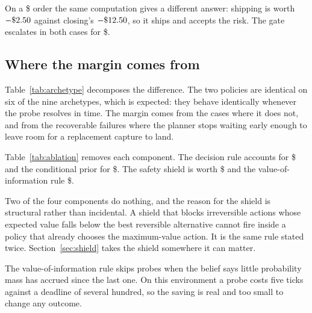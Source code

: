 \documentclass[conference]{IEEEtran}
\begin{document}
On a \$\exSmallAmount{} order the same computation gives a different answer:
shipping is worth $-\$2.50{}$ against closing's $-\$12.50{}$, so
it ships and accepts the risk. The gate escalates in both cases for
\$\exEscalate{}.

\subsection{Where the margin comes from}

\begin{table}[t]
\centering
\caption{The planner against the gate, by archetype. The margin is concentrated
where the gate escalates.}
\label{tab:archetype}
\footnotesize\setlength{\tabcolsep}{4pt}

\end{table}

Table~\ref{tab:archetype} decomposes the difference. The two policies are
identical on six of the nine archetypes, which is expected: they behave
identically whenever the probe resolves in time. The margin comes from the
cases where it does not, and from the recoverable failures where the planner
stops waiting early enough to leave room for a replacement capture to land.



\begin{table}[t]
\centering
\caption{Removing one component at a time. Two of the four are worth nothing.}
\label{tab:ablation}
\footnotesize\setlength{\tabcolsep}{4pt}

\end{table}

Table~\ref{tab:ablation} removes each component. The decision rule accounts for
\$\ablRule{} and the conditional prior for \$\ablPrior. The safety shield is
worth \$\ablShield{} and the value-of-information rule \$\ablVoi.

Two of the four components do nothing, and the reason for the shield is
structural rather than incidental. A shield that blocks irreversible actions
whose expected value falls below the best reversible alternative cannot fire
inside a policy that already chooses the maximum-value action. It is the same
rule stated twice. Section~\ref{sec:shield} takes the shield somewhere it can
matter.

The value-of-information rule skips probes when the belief says little
probability mass has accrued since the last one. On this environment a probe
costs five ticks against a deadline of several hundred, so the saving is real
and too small to change any outcome.
\end{document}

